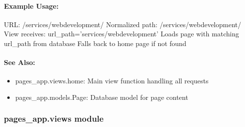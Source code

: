 \documentclass[letterpaper,10pt,english]{sphinxmanual}
\begin{document}
\paragraph{Example Usage:}
\label{\detokenize{pages_app:example-usage}}
\sphinxAtStartPar
URL: /services/web\sphinxhyphen{}development/
\sphinxhyphen{} Normalized path: /services/web\sphinxhyphen{}development/
\sphinxhyphen{} View receives: url\_path=’services/web\sphinxhyphen{}development’
\sphinxhyphen{} Loads page with matching url\_path from database
\sphinxhyphen{} Falls back to home page if not found


\paragraph{See Also:}
\label{\detokenize{pages_app:see-also}}\begin{itemize}
\item {} 
\sphinxAtStartPar
pages\_app.views.home: Main view function handling all requests

\item {} 
\sphinxAtStartPar
pages\_app.models.Page: Database model for page content

\end{itemize}


\subsubsection{pages\_app.views module}
\label{\detokenize{pages_app:module-pages_app.views}}\label{\detokenize{pages_app:pages-app-views-module}}
\end{document}
